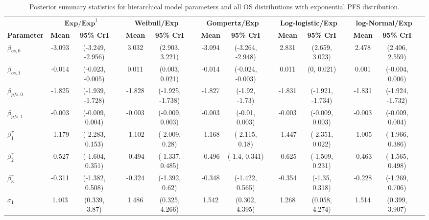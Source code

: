 \documentclass[AMA,STIX1COL]{WileyNJD-v2}
\begin{document}
\begin{landscape}
\begin{center}
\begin{table}[t]
\caption{Posterior summary statistics for hierarchical model parameters and all OS distributions with exponential PFS distribution. \label{tab:post_hier_pfs_exp}}
\centering
\begin{tabular}{l c c c c c c c c c c c c c c c}
\toprule
\multicolumn{1}{l}{} & \multicolumn{2}{c}{$\textbf{Exp/Exp}^1$} & & \multicolumn{2}{c}{\textbf{Weibull/Exp}} & & \multicolumn{2}{c}{\textbf{Gompertz/Exp}} & & \multicolumn{2}{c}{\textbf{Log-logistic/Exp}} & & \multicolumn{2}{c}{\textbf{log-Normal/Exp}}\\
\cmidrule{2-3}\cmidrule{5-6}\cmidrule{8-9}\cmidrule{11-12}\cmidrule{14-15}
\textbf{Parameter} & \textbf{Mean} & \textbf{95\% CrI} & & \textbf{Mean} & \textbf{95\% CrI} & & \textbf{Mean} & \textbf{95\% CrI} & & \textbf{Mean} & \textbf{95\% CrI} & & \textbf{Mean} & \textbf{95\% CrI}\\
\midrule
$\beta_{os, 0}$ & -3.093 & (-3.249, -2.956) &  & 3.032 & (2.903, 3.221) &  & -3.094 & (-3.264, -2.948) &  & 2.831 & (2.659, 3.023) &  & 2.478 & (2.406, 2.559) & \\
$\beta_{os, 1}$ & -0.014 & (-0.023, -0.005) &  & 0.011 & (0.003, 0.021) &  & -0.014 & (-0.024, -0.003) &  & 0.011 & (0, 0.021) &  & 0.001 & (-0.004, 0.006) & \\
$\beta_{pfs, 0}$ & -1.825 & (-1.939, -1.728) &  & -1.828 & (-1.925, -1.738) &  & -1.827 & (-1.92, -1.73) &  & -1.831 & (-1.921, -1.734) &  & -1.831 & (-1.924, -1.732) & \\
$\beta_{pfs, 1}$ & -0.003 & (-0.009, 0.004) &  & -0.003 & (-0.009, 0.003) &  & -0.003 & (-0.01, 0.003) &  & -0.003 & (-0.009, 0.003) &  & -0.003 & (-0.009, 0.004) & \\
$\beta^{\pi}_1$ & -1.179 & (-2.283, 0.153) &  & -1.102 & (-2.009, 0.28) &  & -1.168 & (-2.115, 0.18) &  & -1.447 & (-2.351, 0.022) &  & -1.005 & (-1.966, 0.386) & \\
$\beta^{\pi}_2$ & -0.527 & (-1.604, 0.351) &  & -0.494 & (-1.337, 0.485) &  & -0.496 & (-1.4, 0.341) &  & -0.625 & (-1.509, 0.231) &  & -0.463 & (-1.565, 0.498) & \\
$\beta^{\pi}_3$ & -0.311 & (-1.382, 0.508) &  & -0.324 & (-1.392, 0.62) &  & -0.348 & (-1.422, 0.565) &  & -0.354 & (-1.35, 0.318) &  & -0.228 & (-1.269, 0.706) & \\
$\sigma_1$ & 1.403 & (0.339, 3.87) &  & 1.486 & (0.325, 4.266) &  & 1.542 & (0.302, 4.395) &  & 1.268 & (0.058, 4.274) &  & 1.514 & (0.399, 3.907) & \\

\end{tabular}
\end{table}
\end{center}
\end{landscape}
\end{document}
